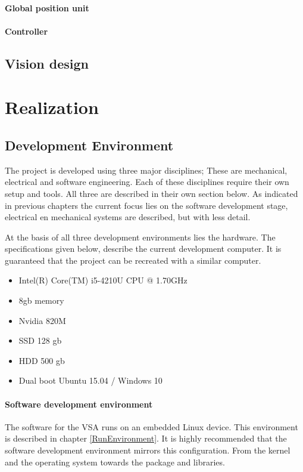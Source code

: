 \documentclass[11pt,fleqn,,a4paper,twoside,openright]{book}
\begin{document}
\subsection{Global position unit}

\subsection{Controller}

\chapter{Vision design}

\part{Realization}

\chapter{Development Environment}
The project is developed using three major disciplines; These are mechanical, electrical and software engineering. Each of these disciplines require their own setup and tools. All three are described in their own section below. As indicated in previous chapters  the current focus lies on the software development stage, electrical en mechanical systems are described, but with less detail.

At the basis of all three development environments lies the hardware. The specifications given below, describe the current development computer. It is guaranteed that the project can be recreated with a similar computer. 
\begin{itemize}
	\item Intel(R) Core(TM) i5-4210U CPU @ 1.70GHz
	\item 8gb memory
	\item Nvidia 820M
	\item SSD 128 gb
	\item HDD 500 gb
	\item Dual boot Ubuntu 15.04 / Windows 10	
\end{itemize}

\subsection{Software development environment}
The software for the VSA runs on an embedded Linux device. This environment is described in chapter \ref{RunEnvironment}. It is highly recommended that the software development environment mirrors this configuration. From the kernel and the operating system towards the package and libraries.
\end{document}
